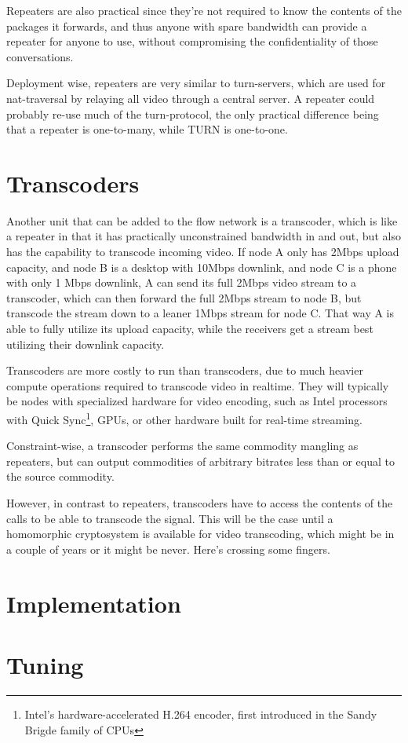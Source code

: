 Repeaters are also practical since they're not required to know the contents of the packages it forwards, and thus anyone with spare bandwidth can provide a repeater for anyone to use, without compromising the confidentiality of those conversations.

Deployment wise, repeaters are very similar to \gls{turn}-servers, which are used for \gls{nat}-traversal by relaying all video through a central server. A repeater could probably re-use much of the \gls{turn}-protocol, the only practical difference being that a repeater is one-to-many, while TURN is one-to-one.


\section{Transcoders}

Another unit that can be added to the flow network is a transcoder, which is like a repeater in that it has practically unconstrained bandwidth in and out, but also has the capability to transcode incoming video. If node A only has 2Mbps upload capacity, and node B is a desktop with 10Mbps downlink, and node C is a phone with only 1 Mbps downlink, A can send its full 2Mbps video stream to a transcoder, which can then forward the full 2Mbps stream to node B, but transcode the stream down to a leaner 1Mbps stream for node C. That way A is able to fully utilize its upload capacity, while the receivers get a stream best utilizing their downlink capacity.

Transcoders are more costly to run than transcoders, due to much heavier compute operations required to transcode video in realtime. They will typically be nodes with specialized hardware for video encoding, such as Intel processors with Quick Sync\footnote{Intel's hardware-accelerated H.264 encoder, first introduced in the Sandy Brigde family of CPUs}, GPUs, or other hardware built for real-time streaming.

Constraint-wise, a transcoder performs the same commodity mangling as repeaters, but can output commodities of arbitrary bitrates less than or equal to the source commodity.

However, in contrast to repeaters, transcoders have to access the contents of the calls to be able to transcode the signal. This will be the case until a homomorphic cryptosystem is available for video transcoding, which might be in a couple of years or it might be never. Here's crossing some fingers.


\section{Implementation}\label{sec:implementation}



\section{Tuning}


